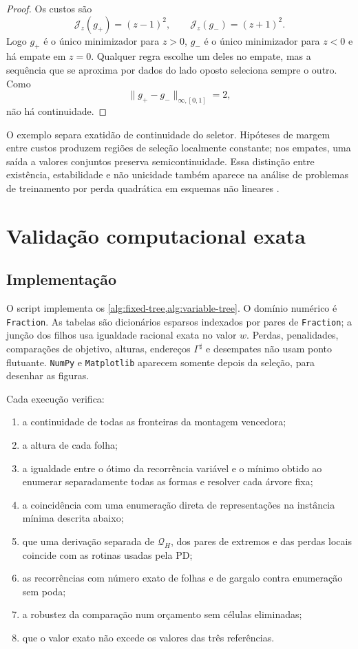 \documentclass[11pt,a4paper]{article}
\theoremstyle{definition}
\theoremstyle{remark}
\newcommand{\cost}{\mathcal{J}}
\begin{document}
\begin{proof}
Os custos são
\[
 \cost_z(g_+)=(z-1)^2,\qquad
 \cost_z(g_-)=(z+1)^2.
\]
Logo $g_+$ é o único minimizador para $z>0$, $g_-$ é o único minimizador para
$z<0$ e há empate em $z=0$. Qualquer regra escolhe um deles no empate, mas a
sequência que se aproxima por dados do lado oposto seleciona sempre o outro.
Como
\[
 \|g_+-g_-\|_{\infty,[0,1]}=2,
\]
não há continuidade.
\end{proof}

O exemplo separa exatidão de continuidade do seletor. Hipóteses de margem
entre custos produzem regiões de seleção localmente constante; nos empates,
uma saída a valores conjuntos preserva semicontinuidade. Essa distinção entre
existência, estabilidade e não unicidade também aparece na análise de problemas
de treinamento por perda quadrática em esquemas não lineares
\citep{christof2021}.

\section{Validação computacional exata}
\label{sec:numerical}

\subsection{Implementação}

O script
implementa os \cref{alg:fixed-tree,alg:variable-tree}. O domínio numérico é
\texttt{Fraction}. As tabelas são dicionários esparsos indexados
por pares de \texttt{Fraction}; a junção dos filhos usa igualdade racional
exata no valor $w$. Perdas, penalidades, comparações de objetivo, alturas,
endereços $\Gamma^\sharp$ e desempates não usam ponto flutuante.
\texttt{NumPy} e \texttt{Matplotlib} aparecem somente depois da seleção, para
desenhar as figuras.

Cada execução verifica:
\begin{enumerate}[label=(\alph*),leftmargin=2em]
 \item a continuidade de todas as fronteiras da montagem vencedora;
 \item a altura de cada folha;
 \item a igualdade entre o ótimo da recorrência variável e o mínimo obtido ao
 enumerar separadamente todas as formas e resolver cada árvore fixa;
 \item a coincidência com uma enumeração direta de representações na
 instância mínima descrita abaixo;
 \item que uma derivação separada de $\mathcal Q_H$, dos pares de extremos
 e das perdas locais coincide com as rotinas usadas pela PD;
 \item as recorrências com número exato de folhas e de gargalo contra
 enumeração sem poda;
 \item a robustez da comparação num orçamento sem células eliminadas;
 \item que o valor exato não excede os valores das três referências.
\end{enumerate}
\end{document}
